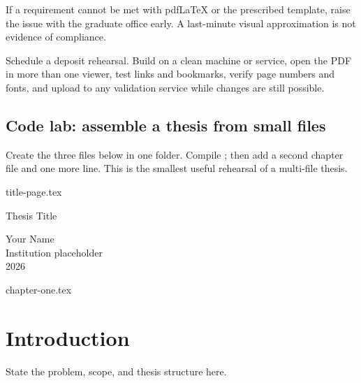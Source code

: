 If a requirement cannot be met with pdf\LaTeX{} or the prescribed template, raise
the issue with the graduate office early. A last-minute visual approximation is
not evidence of compliance.

\begin{goodpractice}
Schedule a deposit rehearsal. Build on a clean machine or service, open the PDF
in more than one viewer, test links and bookmarks, verify page numbers and
fonts, and upload to any validation service while changes are still possible.
\end{goodpractice}

\section{Code lab: assemble a thesis from small files}

\begin{codelab}
Create the three files below in one folder. Compile ; then add a
second chapter file and one more \verb|| line. This is the smallest
useful rehearsal of a multi-file thesis.
\end{codelab}


\begin{latexcode}{title-page.tex}
\begin{titlepage}
  \centering
  {\Large Thesis Title\par}
  \vfill
  Your Name\\
  Institution placeholder\\
  2026
\end{titlepage}
\end{latexcode}

\begin{latexcode}{chapter-one.tex}
\chapter{Introduction}
\label{chap:introduction}
State the problem, scope, and thesis structure here.
\end{latexcode}

